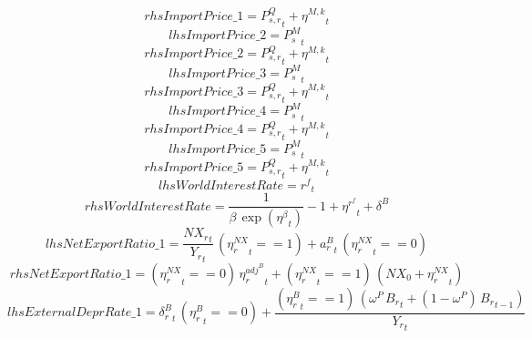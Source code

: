 \begin{dmath*}
rhsImportPrice\_1 = {{P^Q_{s,r}}}_{t}+{{\eta^{M,k}}}_{t}
\end{dmath*}
\begin{dmath*}
lhsImportPrice\_2 = {{P^{M}_s}}_{t}
\end{dmath*}
\begin{dmath*}
rhsImportPrice\_2 = {{P^Q_{s,r}}}_{t}+{{\eta^{M,k}}}_{t}
\end{dmath*}
\begin{dmath*}
lhsImportPrice\_3 = {{P^{M}_s}}_{t}
\end{dmath*}
\begin{dmath*}
rhsImportPrice\_3 = {{P^Q_{s,r}}}_{t}+{{\eta^{M,k}}}_{t}
\end{dmath*}
\begin{dmath*}
lhsImportPrice\_4 = {{P^{M}_s}}_{t}
\end{dmath*}
\begin{dmath*}
rhsImportPrice\_4 = {{P^Q_{s,r}}}_{t}+{{\eta^{M,k}}}_{t}
\end{dmath*}
\begin{dmath*}
lhsImportPrice\_5 = {{P^{M}_s}}_{t}
\end{dmath*}
\begin{dmath*}
rhsImportPrice\_5 = {{P^Q_{s,r}}}_{t}+{{\eta^{M,k}}}_{t}
\end{dmath*}
\begin{dmath*}
lhsWorldInterestRate = {{r^{f}}}_{t}
\end{dmath*}
\begin{dmath*}
rhsWorldInterestRate = \frac{1}{{{\beta}}\, \exp\left({{\eta^{\beta}}}_{t}\right)}-1+{{\eta^{r^f}}}_{t}+{{\delta^B}}
\end{dmath*}
\begin{dmath*}
lhsNetExportRatio\_1 = \frac{{{NX_r}}_{t}}{{{Y_r}}_{t}}\, \left({{\eta^{NX}_r}}_{t}==1\right)+{a^B_r}_{t}\, \left({{\eta^{NX}_r}}_{t}==0\right)
\end{dmath*}
\begin{dmath*}
rhsNetExportRatio\_1 = \left({{\eta^{NX}_r}}_{t}==0\right)\, {{\eta^{adj^B}_r}}_{t}+\left({{\eta^{NX}_r}}_{t}==1\right)\, \left({{NX_0}}+{{\eta^{NX}_r}}_{t}\right)
\end{dmath*}
\begin{dmath*}
lhsExternalDeprRate\_1 = {{\delta^{B}_r}}_{t}\, \left({{\eta^{B}_r}}_{t}==0\right)+\frac{\left({{\eta^{B}_r}}_{t}==1\right)\, \left({{\omega^{P}}}\, {{B_r}}_{t}+\left(1-{{\omega^{P}}}\right)\, {{B_r}}_{t-1}\right)}{{{Y_r}}_{t}}
\end{dmath*}
